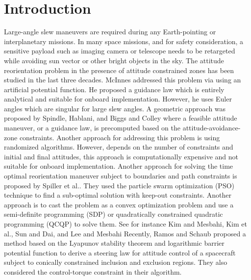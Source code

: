 \documentclass[letterpaper, preprint, paper,11pt]{AAS}	%
\begin{document}
\section{Introduction}
Large-angle slew maneuvers are required during any Earth-pointing or interplanetary missions. In many space missions, and for safety consideration, a sensitive payload such as imaging camera or telescope needs to be retargeted while avoiding sun vector or other bright objects in the sky.
The attitude reorientation problem in the presence of attitude constrained zones has been studied in the last three decades. McInnes\cite{McInnes1994} addressed this problem via using an artificial potential function. He proposed a guidance law which is entirely analytical and suitable for onboard implementation. However, he uses Euler angles which are singular for large slew angles. 
A geometric approach was proposed by Spindle\cite{Spindler1998}, Hablani\cite{Hablani1998}, and Biggs and Colley\cite{Biggs2016}  where a feasible attitude maneuver, or a guidance law, is precomputed based on the attitude-avoidance-zone constraints.  Another approach for addressing this problem is using randomized algorithms\cite{Frazzoli01}. However, depends on the number of constraints and initial and final attitudes, this approach is computationally expensive and not suitable for onboard implementation. Another approach for solving the time optimal reorientation maneuver subject to boundaries and path constraints is proposed by Spiller et al.\cite{Spiller2016}. They used the particle swarm optimization (PSO) technique to find a sub-optimal solution with keep-out constraints. Another approach is to cast the problem as a convex optimization problem and use a semi-definite programming (SDP) or  quadratically constrained quadratic programming (QCQP) to solve them.  See for instance Kim and Mesbahi\cite{Kim2004}, Kim et al.\cite{Kim2010}, Sun and Dai\cite{Sun2015}, and Lee and Mesbahi\cite{Lee2014} %
Recently, Ramos and Schaub\cite{Ramos2018} proposed a method based on the Lyapunov stability theorem and logarithmic barrier potential function to derive a steering law for attitude control of a spacecraft subject to conically constrained inclusion and exclusion regions. They also considered the control-torque constraint in their algorithm.  
\end{document}
